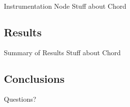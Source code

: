 \documentclass[11pt]{beamer}
\begin{document}
\begin{frame}{Instrumentation Node}
Stuff about Chord
\end{frame}


\subsection{Results}

\begin{frame}{Summary of Results}
Stuff about Chord
\end{frame}

\subsection{Conclusions}

\begin{frame}
Questions?
\end{frame}



\end{document}
